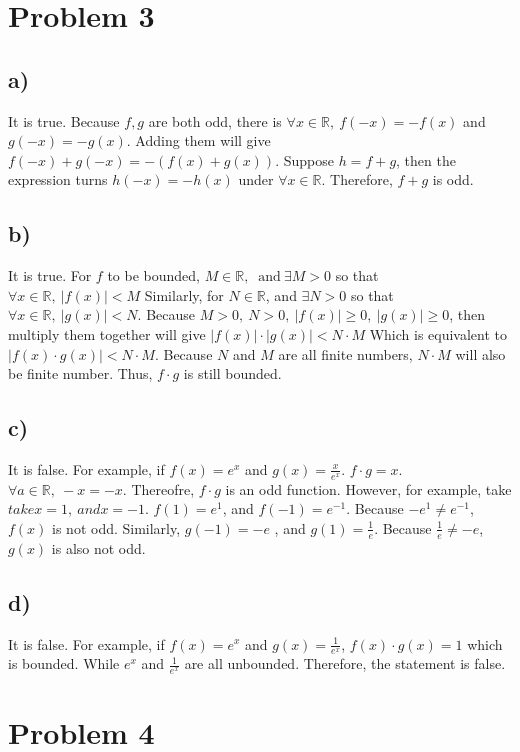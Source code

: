 \documentclass[a4paper,fleqn]{article}
\begin{document}
\section*{Problem 3}
    \subsection*{a)}
    It is true.
        Because \(f,g\) are both odd, there is \(\forall x\in \mathbb{R}, \ f(-x)=-f(x)\) and \(g(-x)=-g(x)\). 
        Adding them will give \(f(-x)+g(-x)=-\left(f(x)+g(x)\right)\). Suppose \(h=f+g\), then the expression 
        turns \(h(-x)=-h(x)\) under \(\forall x \in \mathbb{R}\). Therefore, \(f+g\) is odd.
    \subsection*{b)}
    It is true.
        For \(f\) to be bounded, \(M\in \mathbb{R}, \ \text{ and} \ \exists M > 0\) so that \(\forall x \in \mathbb{R}, \ \left | f(x) \right | < M\)
        Similarly, for \(N\in \mathbb{R}\), and \(\exists N>0\) so that \(\forall x\in \mathbb{R}, \ |g(x)|<N\).
        Because \(M>0,\ N>0,\ |f(x)|\geqslant 0,\ |g(x)| \geqslant 0\), then multiply them together will give \(|f(x)|\cdot |g(x)|<N\cdot M\) Which is 
        equivalent to \(|f(x)\cdot g(x)|<N\cdot M\). Because \(N\) and \(M\) are all finite numbers, \(N\cdot M\) will also be finite number. Thus, \(f\cdot g\) is still bounded.
    \subsection*{c)}
    It is false.
        For example, if \(f(x)=e^x\) and \(g(x)=\frac x {e^x}\). \(f\cdot g = x\). \(\forall a \in \mathbb{R}, \ 
        -x = -x \). Thereofre, \(f\cdot g\) is an odd function. However, for example, take\(take x=1, \ and x=-1\). 
        \(f(1)=e^1\), and \(f(-1)=e^{-1}\). Because \(-e^1 \neq e^{-1}\), \(f(x)\) is not odd. Similarly, \(g(-1)=-e\)
        , and \(g(1)=\frac 1 e\). Because \(\frac 1 e \neq -e\), \(g(x)\) is also not odd.
    \subsection*{d)}
    It is false.
        For example, if \(f(x)=e^x\) and \(g(x) = \frac 1 {e^x}\), \(f(x)\cdot g(x) = 1\) which is bounded. While  \(e^x\) and \(\frac 1 {e^x}\) are all unbounded.
        Therefore, the statement is false.
\section*{Problem 4}
\end{document}

